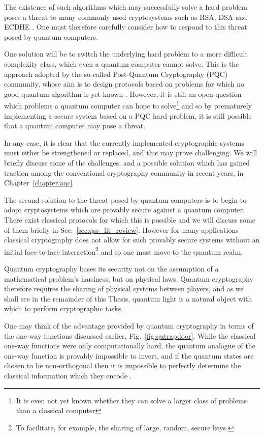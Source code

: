 The existence of such algorithms which may successfully solve a hard problem poses a threat to many commonly used cryptosystems such as RSA, DSA and ECDHE \cite{Rivest1976, Schneier1996, Amiri2015, Nielsen2010}. One must therefore carefully consider how to respond to this threat posed by quantum computers. 

One solution will be to switch the underlying hard problem to a more difficult complexity class, which even a quantum computer cannot solve. This is the approach adopted by the so-called Post-Quantum Cryptography (PQC) community, whose aim is to design protocols based on problems for which no good quantum algorithm is yet known \cite{Bernstein2017, Chen2016, Gagliardoni2017a, Bernstein2019, Alagic2019, Chrome2016}. However, it is still an open question which problems a quantum computer can hope to solve\footnote{It is even not yet known whether they can solve a larger class of problems than a classical computer} and so by prematurely implementing a secure system based on a PQC hard-problem, it is still possible that a quantum computer may pose a threat.

In any case, it is clear that the currently implemented cryptographic systems must either be strengthened or replaced, and this may prove challenging. We will briefly discuss some of the challenges, and a possible solution which has gained traction among the conventional cryptography community in recent years, in Chapter~\ref{chapter:aqc}

The second solution to the threat posed by quantum computers is to begin to adopt cryptosystems which are provably secure against a quantum computer. There exist classical protocols for which this is possible and we will discuss some of them briefly in Sec.~\ref{sec:qss_lit_review}. However for many applications classical cryptography does not allow for such provably secure systems without an initial face-to-face interaction\footnote{To facilitate, for example, the sharing of large, random, secure keys.} and so one must move to the quantum realm.

Quantum cryptography bases its security not on the assumption of a mathematical problem's hardness, but on physical laws. Quantum cryptography therefore requires the sharing of physical systems between players, and as we shall see in the remainder of this Thesis, quantum light is a natural object with which to perform cryptographic tasks. 

One may think of the advantage provided by quantum cryptography in terms of the one-way functions discussed earlier, Fig.~\ref{fig:qutrapdoor}. While the classical one-way functions were only computationally hard, the quantum analogue of the one-way function is provably impossible to invert, and if the quantum states are chosen to be non-orthogonal then it is impossible to perfectly determine the classical information which they encode \cite{Nielsen2010, brendon_book}.

